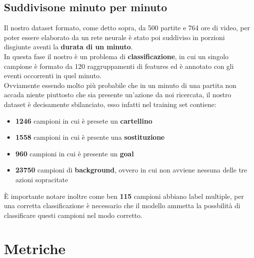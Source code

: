 \subsection{Suddivisone minuto per minuto}
Il nostro dataset formato, come detto sopra, da 500 partite e 764 ore di video, per poter essere elaborato da un rete neurale è stato poi suddiviso in porzioni disgiunte aventi la \textbf{durata di un minuto}.
\\In questa fase il nostro è un problema di \textbf{classificazione}, in cui un singolo campione è formato da 120 raggruppamenti di features ed è annotato con gli eventi occorrenti in quel minuto.
\\Ovviamente essendo molto più probabile che in un minuto di una partita non accada niente piuttosto che sia presente un'azione da noi ricercata, il nostro dataset è decisamente sbilanciato, esso infatti nel training set contiene:
\begin{itemize}
\item \textbf{1246} campioni in cui è presete un \textbf{cartellino}
\item \textbf{1558} campioni in cui è prsente una \textbf{sostituzione}
\item \textbf{960} campioni in cui è presente un \textbf{goal}
\item \textbf{23750} campioni di \textbf{background}, ovvero in cui non avviene nessuna delle tre azioni sopracitate
\end{itemize}
È importante notare inoltre come ben \textbf{115} campioni abbiano label multiple, per una corretta classificazione è necessario che il modello ammetta la possbilità di classificare questi campioni nel modo corretto.
\section{Metriche}
